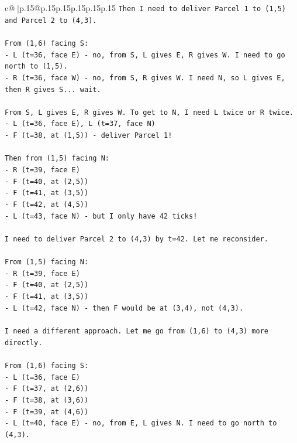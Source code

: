 \documentclass{article}
\begin{document}
{\begin{supertabular}{c@{$\;$}|p{.15\linewidth}@{}p{.15\linewidth}p{.15\linewidth}p{.15\linewidth}p{.15\linewidth}p{.15\linewidth}}
{{{\texttt{Then I need to deliver Parcel 1 to (1,5) and Parcel 2 to (4,3).} \\
\\ 
\texttt{From (1,6) facing S:} \\
\texttt{{-} L (t=36, face E) {-} no, from S, L gives E, R gives W. I need to go north to (1,5).} \\
\texttt{{-} R (t=36, face W) {-} no, from S, R gives W. I need N, so L gives E, then R gives S... wait.} \\
\\ 
\texttt{From S, L gives E, R gives W. To get to N, I need L twice or R twice.} \\
\texttt{{-} L (t=36, face E), L (t=37, face N)} \\
\texttt{{-} F (t=38, at (1,5)) {-} deliver Parcel 1!} \\
\\ 
\texttt{Then from (1,5) facing N:} \\
\texttt{{-} R (t=39, face E)} \\
\texttt{{-} F (t=40, at (2,5))} \\
\texttt{{-} F (t=41, at (3,5))} \\
\texttt{{-} F (t=42, at (4,5))} \\
\texttt{{-} L (t=43, face N) {-} but I only have 42 ticks!} \\
\\ 
\texttt{I need to deliver Parcel 2 to (4,3) by t=42. Let me reconsider.} \\
\\ 
\texttt{From (1,5) facing N:} \\
\texttt{{-} R (t=39, face E)} \\
\texttt{{-} F (t=40, at (2,5))} \\
\texttt{{-} F (t=41, at (3,5))} \\
\texttt{{-} L (t=42, face N) {-} then F would be at (3,4), not (4,3).} \\
\\ 
\texttt{I need a different approach. Let me go from (1,6) to (4,3) more directly.} \\
\\ 
\texttt{From (1,6) facing S:} \\
\texttt{{-} L (t=36, face E)} \\
\texttt{{-} F (t=37, at (2,6))} \\
\texttt{{-} F (t=38, at (3,6))} \\
\texttt{{-} F (t=39, at (4,6))} \\
\texttt{{-} L (t=40, face E) {-} no, from E, L gives N. I need to go north to (4,3).} \\
}}}
\end{supertabular}}
\end{document}
